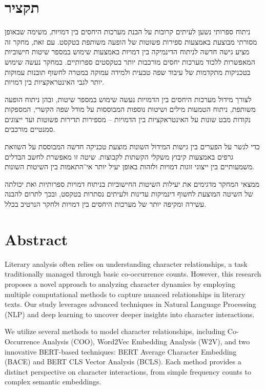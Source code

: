 \documentclass[a4paper,12pt]{report}
\begin{document}
{}
\chapter*{תקציר}ניתוח ספרותי נשען לעיתים קרובות על הבנת מערכות היחסים בין דמויות, משימה שבאופן מסורתי מבוצעת באמצעות ספירות פשוטות של הופעה משותפת בטקסט. עם זאת, מחקר זה מציע גישה חדשה לניתוח הדינמיקה בין דמויות באמצעות שימוש במספר שיטות חישוביות המאפשרות ללכוד מערכות יחסים מורכבות יותר בטקסטים ספרותיים. במחקר נעשה שימוש בטכניקות מתקדמות של עיבוד שפה טבעית ולמידה עמוקה במטרה לחשוף תובנות עמוקות יותר לגבי האינטראקציות בין דמויות.

לצורך מידול מערכות היחסים בין הדמויות נעשה שימוש במספר שיטות, ובהן ניתוח הופעה משותפת, ניתוח הטמעות מילים ושיטות נוספות המבוססות על מודל שפה הקשרי, המספקות נקודות מבט שונות על האינטראקציות בין הדמויות – מספירות תדירות פשוטות ועד ייצוגים סמנטיים מורכבים.

כדי לגשר על הפערים בין גישות המידול השונות מוצעת טכניקה חדשה המבוססת על השוואת גרפים באמצעות קיבוץ משקלי הקשתות לקבוצות. שיטה זו מאפשרת לחשב הבדלים משמעותיים בין ייצוגי זוגות דמויות ולזהות באופן יעיל יותר אי־התאמות בין השיטות השונות.

ממצאי המחקר מדגימים את יעילות השיטות החישוביות בניתוח דמויות ספרותיות ואת יכולתה של השיטה המוצעת לחשוף דינמיקות עדינות ולעיתים נסתרות בטקסט, ובכך לתרום להבנה עשירה ומקיפה יותר של מערכות היחסים בין דמויות ולחקר הנרטיב בכלל.

	\chapter*{Abstract}
	Literary analysis often relies on understanding character relationships, a task traditionally managed through basic co-occurrence counts. However, this research proposes a novel approach to analyzing character dynamics by employing multiple computational methods to capture nuanced relationships in literary texts. Our study leverages advanced techniques in Natural Language Processing (NLP) and deep learning to uncover deeper insights into character interactions.

We utilize several methods to model character relationships, including Co-Occurrence Analysis (COO), Word2Vec Embedding Analysis (W2V), and two innovative BERT-based techniques: BERT Average Character Embedding (BACE) and BERT CLS Vector Analysis (BCLS). Each method provides a distinct perspective on character interactions, from simple frequency counts to complex semantic embeddings.
\end{document}
